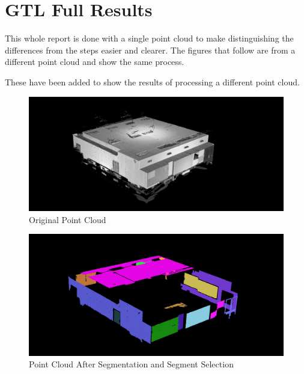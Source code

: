 \chapter{GTL Full Results}
\label{GTL Results}
This whole report is done with a single point cloud to make distinguishing the differences from the steps easier and clearer. The figures that follow are from a different point cloud and show the same process.

These have been added to show the results of processing a different point cloud.

\begin{figure}[H]
\centering
\includegraphics[width=1\linewidth]{Includes/images/Appendix/Before}
\caption{Original Point Cloud}
\label{fig:Before}
\end{figure}

\begin{figure}[H]
\centering
\includegraphics[width=1\linewidth]{Includes/images/Appendix/GTL-Full-seg}
\caption{Point Cloud After Segmentation and Segment Selection}
\label{fig:GTL-Full-seg}
\end{figure}

